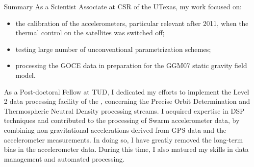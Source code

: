 \begin{cvtext}{Summary}
As a Scientist Associate at \ac{CSR} of the \ac{UTexas}, my work focused on:
\begin{itemize}[topsep=0pt,itemsep=1pt,parsep=0pt,partopsep=0pt]
\item the calibration of the accelerometers, particular relevant after 2011, when the thermal control on the satellites was switched off;
\item testing large number of unconventional parametrization schemes;
\item processing the \ac{GOCE} data in preparation for the GGM07 static gravity field model.
\end{itemize}

As a Post-doctoral Fellow at \ac{TUD}, I dedicated my efforts to implement the Level 2 data processing facility of the , concerning the Precise Orbit Determination and Thermospheric Neutral Density processing streams.
I acquired expertise in \ac{DSP} techniques and contributed to the processing of Swarm accelerometer data, by combining non-gravitational accelerations derived from \ac{GPS} data and the accelerometer measurements.
In doing so, I have greatly removed the long-term bias in the accelerometer data.
During this time, I also matured my skills in data management and automated processing.


\end{cvtext}
